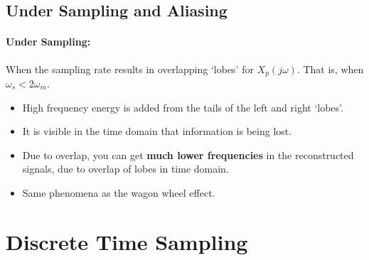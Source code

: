 \documentclass[a4paper,12pt]{report}
\begin{document}
\subsection{Under Sampling and Aliasing}

\paragraph{Under Sampling: } When the sampling rate results in overlapping `lobes' for $X_p(j\omega)$. That is, when $\omega_s < 2\omega_m$.
\begin{itemize}
\item High frequency energy is added from the tails of the left and right `lobes'. 
\item It is visible in the time domain that information is being lost.
\item Due to overlap, you can get \textbf{much lower frequencies} in the reconstructed signals, due to overlap of lobes in time domain. 
\item Same phenomena as the wagon wheel effect.
\end{itemize}

\section{Discrete Time Sampling}
\end{document}
